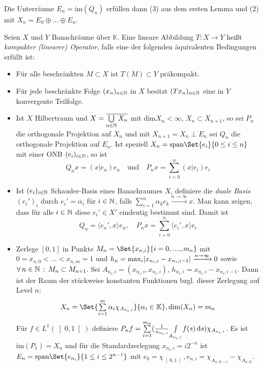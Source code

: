 \documentclass{cheat-sheet}
\newcommand{\K}{\mathbb{K}}
\begin{document}
Die Unterräume $E_n = \mathrm{im}(Q_n)$ erfüllen dann (3) aus dem ersten Lemma und (2) mit $X_n = E_0 \oplus ... \oplus E_n$.

\begin{definition}
  Seien $X$ und $Y$ Banachräume über $\K$. Eine lineare Abbildung $T : X \to Y$ heißt \emph{kompakter (linearer) Operator}, falls eine der folgenden äquivalenten Bedingungen erfüllt ist:
  \begin{itemize}
    \item Für alle beschränkten $M \subset X$ ist $T(M) \subset Y$ präkompakt.
    \item Für jede beschränkte Folge $(x_n)_{n \in \mathbb{N}}$ in $X$ besitzt $(T x_n)_{n \in \mathbb{N}}$ eine in $Y$ konvergente Teilfolge.
  \end{itemize}
\end{definition}

\begin{itemize}
  \item Ist $X$ Hilbertraum und $X = \overline{\bigcup_{n \in \N} X_n}$ mit $\mathrm{dim} X_n < \infty$, $X_n \subset X_{n+1}$, so sei $P_n$ die orthogonale Projektion auf $X_n$ und mit $X_{n+1} = X_n \perp E_n$ sei $Q_n$ die orthogonale Projektion auf $E_n$. Ist speziell $X_n = \mathrm{span} \Set{ e_i }{ 0 \leq i \leq n }$ mit einer ONB $(e_i)_{i \in \mathbb{N}}$, so ist
  \[ Q_n x = (x | e_n) e_n \quad \text{und} \quad P_n x = \sum_{i=0}^n (x|e_i) e_i \]
  \item Ist $(e_i)_{i \in \mathbb{N}}$ Schauder-Basis eines Banachraumes $X$, definiere die \emph{duale Basis} $(e_i')_i$ durch $e_i' = \alpha_i$ für $i \in \mathbb{N}$, falls $\sum_{i=1}^n \alpha_k e_k \xrightarrow{n \to \infty} x$. Man kann zeigen, dass für alle $i \in \mathbb{N}$ diese $e_i' \in X'$ eindeutig bestimmt sind. Damit ist
  \[ Q_n = \langle e_n', x \rangle e_n, \quad P_n x = \sum_{i=0}^n \langle e_i', x \rangle e_i \]
  \item Zerlege $[0, 1]$ in Punkte $M_n = \Set{ x_{n,i} }{ i = 0, ...., m_n }$ mit $0 = x_{n,0} < ... < x_{n,m} = 1$ und $h_n = \max_{i} \lvert x_{n_i,i} - x_{n_i,i-1}\rvert \xrightarrow{n \to \infty} 0$ sowie $\forall \, {n \in \mathbb{N}} \,:\, M_n \subset M_{n+1}$. Sei $A_{n_i,i} = (x_{n_i,i}, x_{n_i,i})$, $h_{n_i,i} = x_{n_i,i} - x_{n_i,i-1}$. Dann ist der Raum der stückweise konstanten Funktionen bzgl. dieser Zerlegung auf Level $n$:
  \[ X_n = \Set{ \sum_{i=1}^m \alpha_i \chi_{A_{n_i,i}} }{ \alpha_i \in \K }, \mathrm{dim}(X_n) = m_n \]
  Für $f \in L^1(\left] 0, 1 \right[)$ definiere $P_n f = \sum_{i=1}^{m_n} (\frac{1}{n_{n_i,i}} \Int{A_{n_i,i}}{}{f(s)}{s}) \chi_{A_{n_i,i}}$.
  Es ist $\mathrm{im}(P_1) = X_n$ und für die Standardzerlegung $x_{n_i,i} = i 2^{-n}$ ist $E_n = \mathrm{span} \Set{ e_{n_i} }{  1 \leq i \leq 2^{n-1} }$ mit $e_0 = \chi_{\left] 0, 1 \right[}, e_{n,i} = \chi_{A_{n,2i-1}} - \chi_{A_{n,2i}}$.
\end{itemize}
\end{document}
